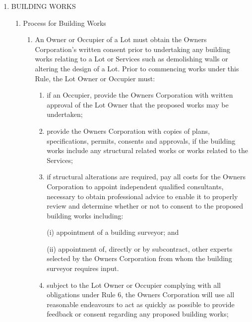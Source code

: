 \documentclass{article}
\begin{document}
\begin{enumerate}[label=\arabic*.]
\begin{enumerate}[label=\arabic{enumi}.\arabic*.]
\begin{enumerate}[label=(\arabic*)]
\begin{enumerate}[label=(\alph*)]
\end{enumerate}

\end{enumerate}

\end{enumerate}

\item  BUILDING WORKS

\begin{enumerate}[label=\arabic{enumi}.\arabic*.]

\item  Process for Building Works

\begin{enumerate}[label=(\arabic*)]

\item  An Owner or Occupier of a Lot must obtain the Owners Corporation’s written consent prior to undertaking any building works relating to a Lot or Services such as demolishing walls or altering the design of a Lot. Prior to commencing works under this Rule, the Lot Owner or Occupier must:

\begin{enumerate}[label=(\alph*)]

\item  if an Occupier, provide the Owners Corporation with written approval of the Lot Owner that the proposed works may be undertaken;

\item  provide the Owners Corporation with copies of plans, specifications, permits, consents and approvals, if the building works include any structural related works or works related to the Services;

\item  if structural alterations are required, pay all costs for the Owners Corporation to appoint independent qualified consultants, necessary to obtain professional advice to enable it to properly review and determine whether or not to consent to the proposed building works including:

(i) appointment of a building surveyor; and

(ii) appointment of, directly or by subcontract, other experts selected by the Owners Corporation from whom the building surveyor requires input.

\item  subject to the Lot Owner or Occupier complying with all obligations under Rule 6, the Owners Corporation will use all reasonable endeavours to act as quickly as possible to provide feedback or consent regarding any proposed building works;


\end{enumerate}
\end{enumerate}
\end{enumerate}
\end{enumerate}
\end{document}
